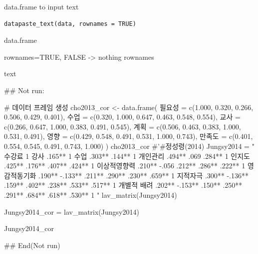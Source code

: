 \documentclass[a4paper]{book}
\begin{document}
%
\begin{Description}
data.frame to input text
\end{Description}
%
\begin{Usage}
\begin{verbatim}
datapaste_text(data, rownames = TRUE)
\end{verbatim}
\end{Usage}
%
\begin{Arguments}
\begin{ldescription}
\item[\code{data}] data.frame

\item[\code{rownames}] rownames=TRUE, FALSE -> nothing rownames
\end{ldescription}
\end{Arguments}
%
\begin{Value}
text
\end{Value}
%
\begin{Examples}
\begin{ExampleCode}

\#\# Not run: 

# 데이터 프레임 생성
cho2013_cor <- data.frame(
  필요성 = c(1.000, 0.320, 0.266, 0.506, 0.429, 0.401),
  수업 = c(0.320, 1.000, 0.647, 0.463, 0.548, 0.554),
  교사 = c(0.266, 0.647, 1.000, 0.383, 0.491, 0.545),
  계획 = c(0.506, 0.463, 0.383, 1.000, 0.531, 0.491),
  영향 = c(0.429, 0.548, 0.491, 0.531, 1.000, 0.743),
  만족도 = c(0.401, 0.554, 0.545, 0.491, 0.743, 1.000)
)
cho2013_cor %
#'#정성령(2014)
Jungsy2014 = "
수강료 1
강사 .165** 1
수업 .303** .144** 1
개인관리 .494** .069 .284** 1
인지도 .425** .176** .407** .424** 1
이상적영향력 .210** -.056 .212** .286** .222** 1
영감적동기화 .190** -.133** .211** .290** .230** .659** 1
지적자극 .300** -.136** .159** .402** .238** .533** .517** 1
개별적 배려 .202** -.153** .150** .250** .291** .684** .618** .530** 1
"
lav_matrix(Jungsy2014)

Jungsy2014_cor = lav_matrix(Jungsy2014)

Jungsy2014_cor %

## End(Not run)

\end{ExampleCode}
\end{Examples}
\end{document}
